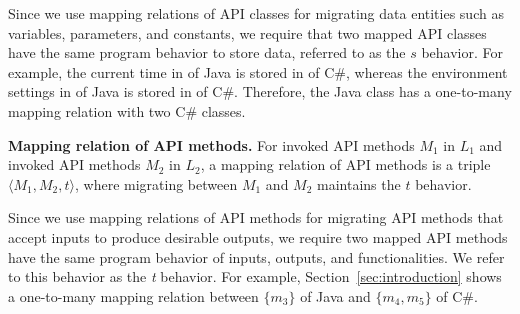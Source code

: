 Since we use mapping relations of API classes for migrating data entities such as
variables, parameters, and constants, we require that two mapped
API classes have the same program behavior to store data, referred to as
the $s$ behavior. For example, the current time in  of Java
is stored in  of C\#, whereas the
environment settings in  of Java is stored in
 of C\#. Therefore, the Java class has a
one-to-many mapping relation with two C\# classes.



%

\textbf{Mapping relation of API methods.} For invoked API methods
$M_1$ in $L_1$ and invoked API methods $M_2$ in
$L_2$, a mapping relation of API methods is a triple
$\langle M_1, M_2, t \rangle$, where migrating between $M_1$ and $M_2$ maintains the $t$ behavior.

Since we use mapping relations of API methods for migrating API methods
that accept inputs to produce desirable outputs, we require two
mapped API methods have the same program behavior of inputs, outputs, and
functionalities. We refer to this behavior as the \emph{t} behavior. For example, Section~\ref{sec:introduction} shows a one-to-many mapping relation between $\{m_3\}$ of Java and $\{m_4, m_5\}$ of C\#. 
